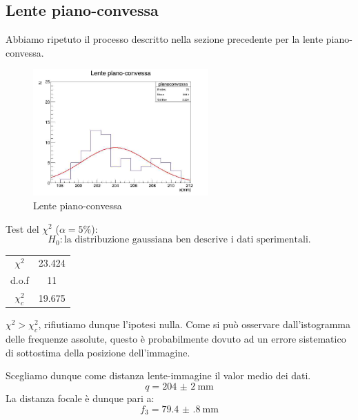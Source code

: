 \documentclass[a4paper]{article}
\begin{document}
    \subsection{Lente piano-convessa}
    Abbiamo ripetuto il processo descritto nella sezione precedente per la lente piano-convessa.
    \begin{figure}[H]
    	\centering
    	\includegraphics[width=0.6\textwidth]{histo3.jpg}
    	\caption{Lente piano-convessa}
    	\label{fig:piano-convessa}
    \end{figure}
    Test del $\chi^2$ ($\alpha=5\%$):
     \[
    H_0: \text{la distribuzione gaussiana ben descrive i dati sperimentali.}
    \]
    \begin{table}[H]
    	\centering
    	\begin{tabular}{|c|c|}
    		\hline
    		$\chi^2$ & 23.424 \\
    		d.o.f & 11 \\
    		$\chi^2_c$ & 19.675 \\ \hline
    	\end{tabular}
    	\label{tab:chi-quadro-piano-convessa}
    \end{table}
    $\chi^2>\chi^2_c$, rifiutiamo dunque l'ipotesi nulla. Come si può osservare dall'istogramma delle frequenze assolute, questo è probabilmente dovuto ad un errore sistematico di sottostima della posizione dell'immagine.
    
    Scegliamo dunque come distanza lente-immagine il valor medio dei dati.
    \[
    q=\SI{204(2)}{\mm}
    \]
    La distanza focale è dunque pari a:
    \[
    f_3=\SI{79.4(8)}{\mm}
    \]
\end{document}
